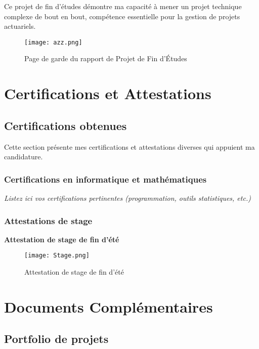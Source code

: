 \documentclass[12pt,a4paper]{article}
\begin{document}
\begin{itemize}
Ce projet de fin d'études démontre ma capacité à mener un projet technique complexe de bout en bout, compétence essentielle pour la gestion de projets actuariels.

\begin{figure}[h]
    \centering
    \texttt{[image: azz.png]}
    \caption{Page de garde du rapport de Projet de Fin d'Études}
    \label{fig:pfe_cover}
\end{figure}

\newpage

\section{Certifications et Attestations}
\label{sec:certifications}

\subsection{Certifications obtenues}
Cette section présente mes certifications et attestations diverses qui appuient ma candidature.

\subsubsection{Certifications en informatique et mathématiques}
\textit{Listez ici vos certifications pertinentes (programmation, outils statistiques, etc.)}

\subsubsection{Attestations de stage}

\textbf{Attestation de stage de fin d'été}

\begin{figure}[h]
    \centering
    \texttt{[image: Stage.png]}
    \caption{Attestation de stage de fin d'été}
    \label{fig:attestation_stage}
\end{figure}

\newpage

\section{Documents Complémentaires}
\label{sec:complementaires}

\subsection{Portfolio de projets}


\end{itemize}
\end{document}
